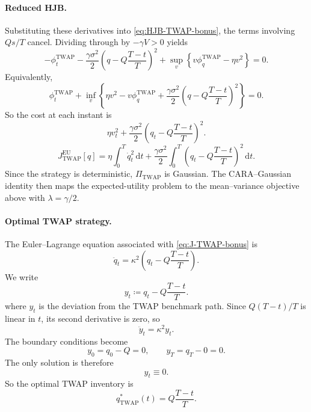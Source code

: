 \documentclass[12pt, a4paper]{article}
\newcommand{\dd}{\,\mathrm{d}}
\newcommand{\kap}{\kappa}
\begin{document}
\paragraph{Reduced HJB.}
Substituting these derivatives into \eqref{eq:HJB-TWAP-bonus}, the terms
involving $Qs/T$ cancel. Dividing through by $-\gamma V > 0$ yields
\begin{equation}
  -\phi_t^{\mathrm{TWAP}}
  -
  \frac{\gamma\sigma^2}{2}
  \left(q-Q\frac{T-t}{T}\right)^2
  +
  \sup_v
  \left\{
    v\phi_q^{\mathrm{TWAP}} - \eta v^2
  \right\}
  = 0.
  \label{eq:reduced-HJB-TWAP-bonus}
\end{equation}
Equivalently,
\begin{equation}
  \phi_t^{\mathrm{TWAP}}
  +
  \inf_v
  \left\{
    \eta v^2
    -
    v\phi_q^{\mathrm{TWAP}}
    +
    \frac{\gamma\sigma^2}{2}
    \left(q-Q\frac{T-t}{T}\right)^2
  \right\}
  = 0.
  \label{eq:TWAP-running-cost-bonus}
\end{equation}
So the cost at each instant is
\[
  \eta v_t^2
  +
  \frac{\gamma\sigma^2}{2}
  \left(q_t-Q\frac{T-t}{T}\right)^2.
\]
\begin{equation}
  J_{\mathrm{TWAP}}^{\mathrm{EU}}[q]
  =
  \eta\!\int_0^T \dot q_t^2 \dd t
  +
  \frac{\gamma\sigma^2}{2}\!\int_0^T
  \left(q_t-Q\frac{T-t}{T}\right)^2 \dd t.
  \label{eq:J-TWAP-bonus}
\end{equation}
Since the strategy is deterministic, $\Pi_{\mathrm{TWAP}}$ is Gaussian.
The CARA--Gaussian identity then maps the expected-utility problem to the mean--variance objective above with $\lambda = \gamma/2$.

\paragraph{Optimal TWAP strategy.}
The Euler--Lagrange equation associated with \eqref{eq:J-TWAP-bonus} is
\begin{equation}
  \ddot q_t
  =
  \kap^2\left(q_t-Q\frac{T-t}{T}\right).
  \label{eq:EL-TWAP-bonus}
\end{equation}
We write
\[
  y_t \coloneqq q_t-Q\frac{T-t}{T}.
\]
where $y_t$ is the deviation from the TWAP benchmark path.
Since $Q(T-t)/T$ is linear in $t$, its second derivative is zero, so
\[
  \ddot y_t = \kap^2 y_t.
\]
The boundary conditions become
\[
  y_0 = q_0-Q = 0,
  \qquad
  y_T = q_T-0 = 0.
\]
The only solution is therefore
\[
  y_t \equiv 0.
\]
So the optimal TWAP inventory is
\begin{equation}
  \boxed{
    q_{\mathrm{TWAP}}^*(t)
    =
    Q\frac{T-t}{T}.
  }
  \label{eq:qstar-TWAP-bonus}
\end{equation}
\end{document}
